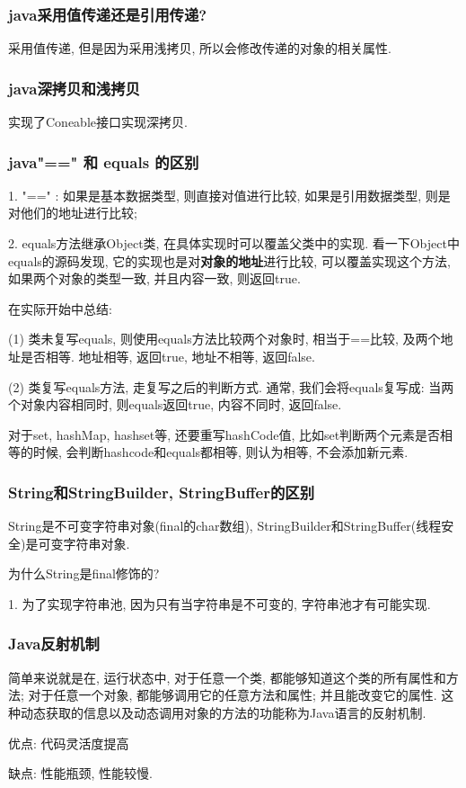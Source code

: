 \subsubsection{java采用值传递还是引用传递?}
采用值传递, 但是因为采用浅拷贝, 所以会修改传递的对象的相关属性.
\subsubsection{java深拷贝和浅拷贝}
实现了Coneable接口实现深拷贝.
\subsubsection{java"==" 和 equals 的区别}
1. "==" : 如果是基本数据类型, 则直接对值进行比较, 如果是引用数据类型, 则是对他们的地址进行比较;
\par
2. equals方法继承Object类, 在具体实现时可以覆盖父类中的实现. 看一下Object中equals的源码发现, 它的实现也是对\textbf{对象的地址}进行比较, 可以覆盖实现这个方法, 如果两个对象的类型一致, 并且内容一致, 则返回true.
\par
在实际开始中总结:
\par
(1) 类未复写equals, 则使用equals方法比较两个对象时, 相当于==比较, 及两个地址是否相等. 地址相等, 返回true, 地址不相等, 返回false.
\par
(2) 类复写equals方法, 走复写之后的判断方式. 通常, 我们会将equals复写成: 当两个对象内容相同时, 则equals返回true, 内容不同时, 返回false.
\par
对于set, hashMap, hashset等, 还要重写hashCode值, 比如set判断两个元素是否相等的时候, 会判断hashcode和equals都相等, 则认为相等, 不会添加新元素.
\subsubsection{String和StringBuilder, StringBuffer的区别}
String是不可变字符串对象(final的char数组), StringBuilder和StringBuffer(线程安全)是可变字符串对象.
\par
为什么String是final修饰的?
\par
1. 为了实现字符串池, 因为只有当字符串是不可变的, 字符串池才有可能实现.
\subsubsection{Java反射机制}
简单来说就是在, 运行状态中, 对于任意一个类, 都能够知道这个类的所有属性和方法; 对于任意一个对象, 都能够调用它的任意方法和属性; 并且能改变它的属性. 这种动态获取的信息以及动态调用对象的方法的功能称为Java语言的反射机制.
\par
优点: 代码灵活度提高
\par
缺点: 性能瓶颈, 性能较慢.
